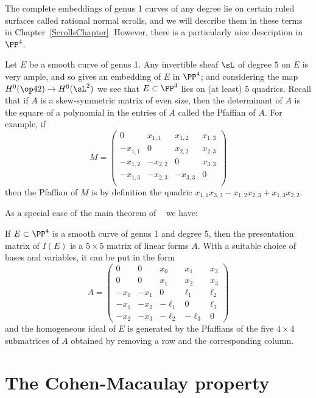 The complete embeddings of genus 1 curves of any degree lie on certain ruled surfaces called rational
normal scrolls, and we will describe them in these terms in Chapter~\ref{ScrollsChapter}. However, there is a particularly nice description in $\PP^4$. 

\begin{fact}
Let $E$ be a smooth curve of genus 1. Any invertible sheaf $\sL$ of degree $5$ on $E$ is very ample, and so gives an embedding of $E$ in $\PP^4$; and considering the map $H^0(\op42) \to H^0(\sL^2)$
we see that $E\subset \PP^4$ lies on (at least) 5 quadrics. 
Recall that if $A$ is a skew-symmetric matrix of even size,
then the determinant of $A$ is the square of a polynomial in the entries of $A$ called the Pfaffian of $A$. For example, if
$$
M = \begin{pmatrix}
0&x_{1,1}&x_{1,2}&x_{1,3}\\
-x_{1,1}&0&x_{2,2}&x_{2,3}\\
-x_{1,2}&-x_{2,2}&0&x_{3,3}\\
-x_{1,3}&-x_{2,3}&-x_{3,3}&0\\
\end{pmatrix}
$$
then the Pfaffian of $M$ is by definition the quadric $x_{1,1}x_{3,3}-x_{1,2}x_{2,3}+x_{1,3}x_{2,2}$.

As a special case of the main theorem of ~\cite{MR453723} we have:
\begin{proposition} \cite[Theorem11]{Eisenbud1995}
If $E\subset \PP^4$ is a smooth curve of genus 1 and degree 5, then the presentation matrix of $I(E)$ is
a $5\times 5$ matrix of linear forms $A$. With a suitable choice of bases and variables, it can be put in the form
$$
A = 
\begin{pmatrix}
0&0&x_0&x_1&x_2\\
0&0&x_1&x_2&x_3\\
-x_0&-x_1&0&\ell_1&\ell_2\\
-x_1&-x_2&-\ell_1&0&\ell_3\\
-x_2&-x_3&-\ell_2&-\ell_3&0
\end{pmatrix}
$$
and
the homogeneous ideal of $E$ is generated by the  Pfaffians of the five $4\times 4$ submatrices of $A$ obtained by removing
a row and the corresponding column.
\end{proposition}
\end{fact}

\section{The Cohen-Macaulay property}\label{ACM}

